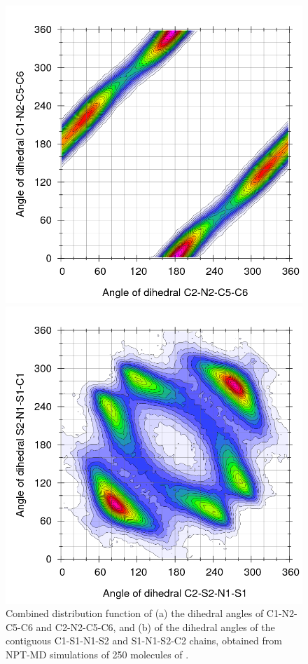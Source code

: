 \documentclass[3p,twocolumn]{elsarticle}
\begin{document}
\begin{figure}[ht]
\centering
  \includegraphics[width=\linewidth]{Ludwig}%

  \includegraphics[width=\linewidth]{Ludwig_anion}%
\caption{Combined distribution function of (a) the dihedral angles of C1-N2-C5-C6 and C2-N2-C5-C6, and (b) of the dihedral angles of the contiguous  C1-S1-N1-S2 and S1-N1-S2-C2 chains, obtained from NPT-MD simulations of 250 molecules of \ce{[emim][NTf_2]}.}
\label{fig:die_ntf2}
\end{figure}
\end{document}
